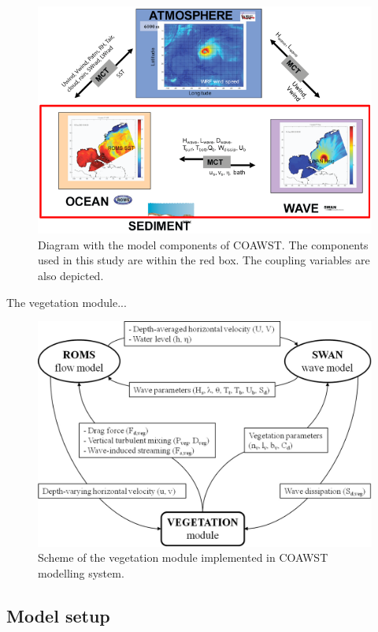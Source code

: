 \documentclass[12pt]{article}
\begin{document}
\begin{figure}[h]
    \centering
    \includegraphics[scale=0.7]{plots/coawst_structure.PNG}
    \caption{Diagram with the model components of COAWST. The components used in this study are within the red box. The coupling variables are also depicted.}
    \label{fig:coawst_structure}
\end{figure}

The vegetation module...

\begin{figure}[h]
    \centering
    \includegraphics[scale=1.1]{plots/scheme_vegetation_module.jpg}
    \caption{Scheme of the vegetation module implemented in COAWST modelling system.}
    \label{fig:scheme_vegetation_module}
\end{figure}

\subsection{Model setup} \label{sec:model_setup}
\end{document}
